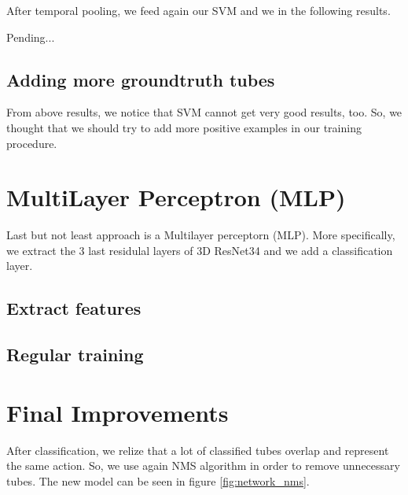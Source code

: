 \documentclass{report}
\begin{document}
After temporal pooling, we feed again our SVM and we in the following results.

Pending...

\subsection{Adding more groundtruth tubes}
From above results, we notice that SVM cannot get very good results, too. So, we thought that we should try to add more positive
examples in our training procedure. 

\section{MultiLayer Perceptron (MLP)}
Last but not least approach is a Multilayer perceptorn (MLP). More specifically, we extract the 3 last residulal layers of 3D ResNet34
and we add a classification layer.  
\subsection{Extract features}
\subsection{Regular training}

\section{Final Improvements}
After classification, we relize that a lot of classified tubes overlap and represent the same action. So, we use again NMS algorithm in order
to remove unnecessary tubes. The new model can be seen in figure \ref{fig:network_nms}.
\end{document}
